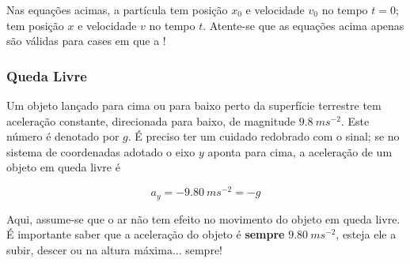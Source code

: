 Nas equações acimas, a partícula tem posição $x_0$ e velocidade $v_0$ no tempo $t=0$; tem posição $x$ e velocidade $v$ no tempo $t$.
Atente-se que as equações acima apenas são válidas para cases em que a !

\subsubsection{Queda Livre}
Um objeto lançado para cima ou para baixo perto da superfície terrestre tem aceleração constante, direcionada para baixo, de magnitude $9.8\ ms^{-2}$. Este número é denotado por $g$.
É preciso ter um cuidado redobrado com o sinal; se no sistema de coordenadas adotado o eixo $y$ aponta para cima, a aceleração de um objeto em queda livre é

\begin{equation}
    a_y=-9.80\ ms^{-2}=-g
\end{equation}

Aqui, assume-se que o ar não tem efeito no movimento do objeto em queda livre. É importante saber que a aceleração do objeto é \textbf{sempre} $9.80\ ms^{-2}$, esteja ele a subir, descer ou na altura máxima... sempre!